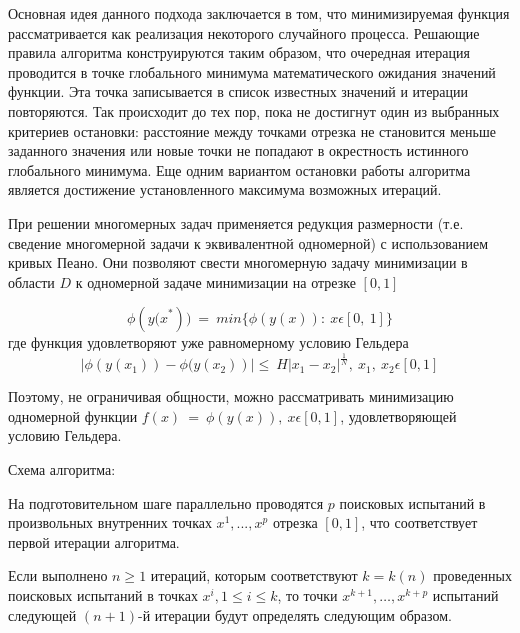 \documentclass[12pt, a4paper, russian]{article}
\begin{document}
Основная идея данного подхода заключается в том, что минимизируемая функция рассматривается как реализация некоторого случайного процесса. Решающие правила алгоритма конструируются таким образом, что очередная итерация проводится в точке глобального минимума математического ожидания значений функции. Эта точка записывается в список известных значений и итерации повторяются. Так происходит до тех пор, пока не достигнут один из выбранных критериев остановки: расстояние между точками отрезка не становится меньше заданного значения или новые точки не попадают в окрестность истинного глобального минимума. Еще одним вариантом остановки работы алгоритма является достижение установленного максимума возможных итераций. \cite{fio_bib10}

При решении многомерных задач применяется редукция размерности (т.е. сведение многомерной задачи к эквивалентной одномерной) с использованием кривых Пеано. Они позволяют свести многомерную задачу минимизации в области $D$  к одномерной задаче минимизации на отрезке $[0, 1]$

\begin{equation*}
\phi({y(x}^\ast))\ =\ min\{\phi(y(x)):\ x\epsilon[0,\ 1]\}
\end{equation*}
где функция  удовлетворяют уже равномерному условию Гельдера
\begin{equation*}
\left|\phi (y \left(x_1\right))- \phi (y \left(x_2\right)\right )|\le\ H\left|x_1-x_2\right|^\frac{1}{N},\ x_1,\ x_2\epsilon[0,1]		
\end{equation*}

Поэтому, не ограничивая общности, можно рассматривать минимизацию одномерной функции $f(x)\ =\ \phi(y(x)), \ x\epsilon [0,1]$, удовлетворяющей условию Гельдера.

Схема алгоритма:

На подготовительном шаге параллельно проводятся $p$ поисковых испытаний в произвольных внутренних точках $x^1, ...,x^p$ отрезка $[0,1]$, что соответствует первой итерации  алгоритма. 

Если выполнено $n\geq1$ итераций, которым соответствуют $k=k(n)$ проведенных поисковых испытаний в точках $x^i, 1\leq i\leq k$, то точки $x^{k+1},\ldots,x^{k+p}$ испытаний следующей $(n+1)$-й итерации будут определять следующим образом.
\end{document}
